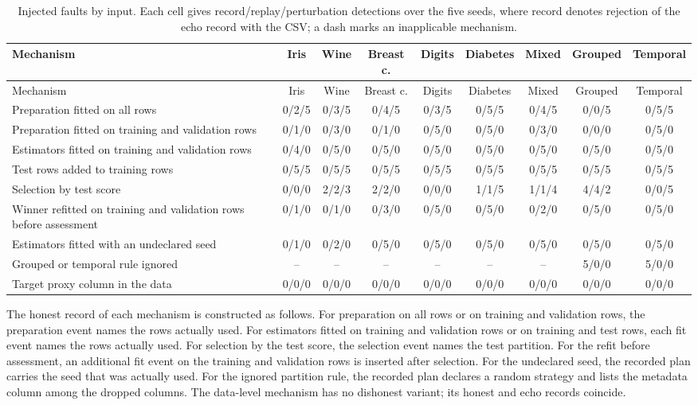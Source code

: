 \documentclass[11pt,letterpaper]{article}
\begin{document}
\setlength{\tabcolsep}{3.5pt}
\begin{longtable}{p{}cccccccc}
\caption{Injected faults by input. Each cell gives record/replay/perturbation detections over the five seeds, where record denotes rejection of the echo record with the CSV; a dash marks an inapplicable mechanism.}\label{tab:faultinput}\\
\toprule Mechanism & Iris & Wine & Breast c. & Digits & Diabetes & Mixed & Grouped & Temporal\\\midrule\endfirsthead
\toprule Mechanism & Iris & Wine & Breast c. & Digits & Diabetes & Mixed & Grouped & Temporal\\\midrule\endhead
Preparation fitted on all rows & 0/2/5 & 0/3/5 & 0/4/5 & 0/3/5 & 0/5/5 & 0/4/5 & 0/0/5 & 0/5/5\\
Preparation fitted on training and validation rows & 0/1/0 & 0/3/0 & 0/1/0 & 0/5/0 & 0/5/0 & 0/3/0 & 0/0/0 & 0/5/0\\
Estimators fitted on training and validation rows & 0/4/0 & 0/5/0 & 0/5/0 & 0/5/0 & 0/5/0 & 0/5/0 & 0/5/0 & 0/5/0\\
Test rows added to training rows & 0/5/5 & 0/5/5 & 0/5/5 & 0/5/5 & 0/5/5 & 0/5/5 & 0/5/5 & 0/5/5\\
Selection by test score & 0/0/0 & 2/2/3 & 2/2/0 & 0/0/0 & 1/1/5 & 1/1/4 & 4/4/2 & 0/0/5\\
Winner refitted on training and validation rows before assessment & 0/1/0 & 0/1/0 & 0/3/0 & 0/5/0 & 0/5/0 & 0/2/0 & 0/5/0 & 0/5/0\\
Estimators fitted with an undeclared seed & 0/1/0 & 0/2/0 & 0/5/0 & 0/5/0 & 0/5/0 & 0/5/0 & 0/5/0 & 0/5/0\\
Grouped or temporal rule ignored & -- & -- & -- & -- & -- & -- & 5/0/0 & 5/0/0\\
Target proxy column in the data & 0/0/0 & 0/0/0 & 0/0/0 & 0/0/0 & 0/0/0 & 0/0/0 & 0/0/0 & 0/0/0\\
\bottomrule
\end{longtable}

The honest record of each mechanism is constructed as follows. For preparation on all rows or on training and validation rows, the preparation event names the rows actually used. For estimators fitted on training and validation rows or on training and test rows, each fit event names the rows actually used. For selection by the test score, the selection event names the test partition. For the refit before assessment, an additional fit event on the training and validation rows is inserted after selection. For the undeclared seed, the recorded plan carries the seed that was actually used. For the ignored partition rule, the recorded plan declares a random strategy and lists the metadata column among the dropped columns. The data-level mechanism has no dishonest variant; its honest and echo records coincide.
\end{document}
